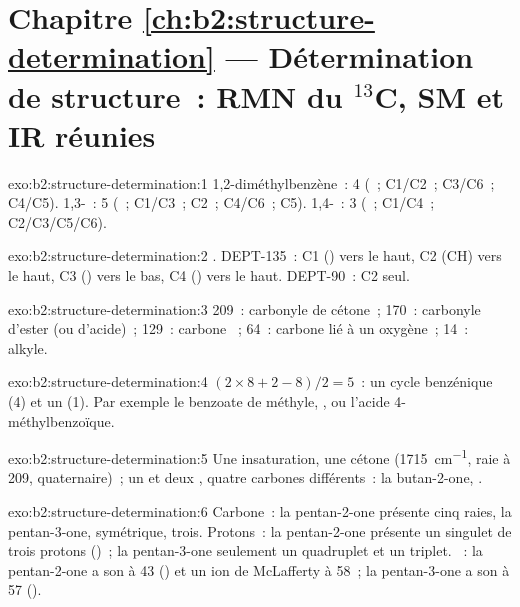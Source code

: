 \section*{Chapitre \ref{ch:b2:structure-determination} --- Détermination de structure~: RMN du \texorpdfstring{$^{13}$C}{13C}, SM et IR réunies}

\begin{solution}{exo:b2:structure-determination:1}
1,2-diméthylbenzène~: 4 (~; C1/C2~; C3/C6~; C4/C5). 1,3-~: 5 (~; C1/C3~; C2~; C4/C6~; C5).
1,4-~: 3 (~; C1/C4~; C2/C3/C5/C6).
\end{solution}

\begin{solution}{exo:b2:structure-determination:2}
. DEPT-135~: C1 () vers le haut, C2 (CH) vers le haut, C3 () vers le
bas, C4 () vers le haut. DEPT-90~: C2 seul.
\end{solution}

\begin{solution}{exo:b2:structure-determination:3}
209~: carbonyle de cétone~; 170~: carbonyle d'ester (ou d'acide)~; 129~: carbone ~; 64~: carbone
lié à un oxygène~; 14~:  alkyle.
\end{solution}

\begin{solution}{exo:b2:structure-determination:4}
$(2 \times 8 + 2 - 8)/2 = 5$~: un cycle benzénique (4) et un  (1). Par exemple le benzoate de
méthyle, , ou l'acide 4-méthylbenzoïque.
\end{solution}

\begin{solution}{exo:b2:structure-determination:5}
Une insaturation, une cétone (\qty{1715}{cm^{-1}}, raie à 209, quaternaire)~; un  et deux
, quatre carbones différents~: la butan-2-one, .
\end{solution}

\begin{solution}{exo:b2:structure-determination:6}
Carbone~: la pentan-2-one présente cinq raies, la pentan-3-one, symétrique, trois. Protons~: la
pentan-2-one présente un singulet de trois protons ()~; la pentan-3-one seulement un quadruplet
et un triplet. ~: la pentan-2-one a son  à 43 () et un ion de
McLafferty à 58~; la pentan-3-one a son  à 57
().
\end{solution}

